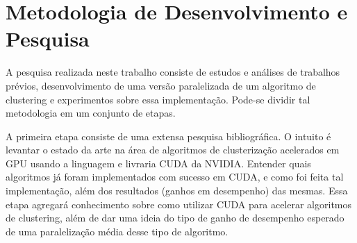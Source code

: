\documentclass[12pt, %
openright, 
oneside, %
a4paper,    %
brazil]{facom-ufu-abntex2}
\begin{document}










\chapter{Metodologia de Desenvolvimento e Pesquisa}

A pesquisa realizada neste trabalho consiste de estudos e análises de trabalhos prévios, desenvolvimento de uma versão paralelizada de um algoritmo de clustering e experimentos sobre essa implementação. Pode-se dividir tal metodologia em um conjunto de etapas.

A primeira etapa consiste de uma extensa pesquisa bibliográfica. O intuito é levantar o estado da arte na área de algoritmos de clusterização acelerados em GPU usando a linguagem e livraria CUDA da NVIDIA. Entender quais algoritmos já foram implementados com sucesso em CUDA, e como foi feita tal implementação, além dos resultados (ganhos em desempenho) das mesmas. Essa etapa agregará conhecimento sobre como utilizar CUDA para acelerar algoritmos de clustering, além de dar uma ideia do tipo de ganho de desempenho esperado de uma paralelização média desse tipo de algoritmo.
\end{document}
